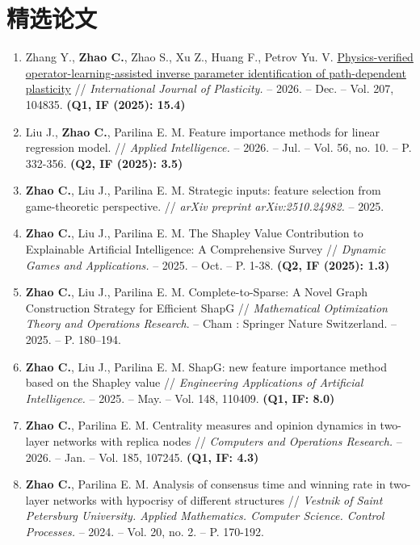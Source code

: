 \documentclass[letterpaper,10pt,fontset=none]{ctexart}
\begin{document}
\section{精选论文}
\begin{enumerate}[itemsep=2pt,parsep=0pt]
  \fontsize{10}{10.5}\selectfont
  \item Zhang Y., \textbf{Zhao C.}, Zhao S., Xu Z., Huang F., Petrov Yu. V.
        \href{https://doi.org/10.1016/j.ijplas.2026.104835}{Physics-verified
        operator-learning-assisted inverse parameter identification of
        path-dependent plasticity} // {\it International Journal of
        Plasticity.} -- 2026. -- Dec. -- Vol. 207, 104835. {\bf (Q1, IF (2025):
        15.4)}
  \item Liu J., \textbf{Zhao C.}, Parilina E. M. Feature importance methods for
        linear regression model. // {\it Applied Intelligence.} -- 2026. --
        Jul. -- Vol. 56, no. 10. -- P. 332-356. {\bf (Q2, IF (2025): 3.5)}
  \item \textbf{Zhao C.}, Liu J., Parilina E. M. Strategic inputs: feature selection from game-theoretic perspective. // {\it arXiv preprint arXiv:2510.24982.} -- 2025.
  \item \textbf{Zhao C.}, Liu J., Parilina E. M. The Shapley Value Contribution to Explainable Artificial Intelligence: A Comprehensive Survey // {\it Dynamic Games and Applications.} -- 2025. -- Oct. -- P. 1-38. {\bf (Q2, IF (2025): 1.3)}
  \item \textbf{Zhao C.}, Liu J., Parilina E. M. Complete-to-Sparse: A Novel Graph Construction Strategy for Efficient ShapG // {\it Mathematical Optimization Theory and Operations Research}. -- Cham : Springer Nature Switzerland. -- 2025. -- P. 180–194.
  \item \textbf{Zhao C.}, Liu J., Parilina E. M. ShapG: new feature importance method based on the Shapley value // {\it Engineering Applications of Artificial Intelligence.} -- 2025. -- May. -- Vol. 148, 110409. {\bf (Q1, IF: 8.0)}
        \newpage
  \item \textbf{Zhao C.}, Parilina E. M. Centrality measures and opinion dynamics in two-layer networks with replica nodes // {\it Computers and Operations Research.} -- 2026. -- Jan. -- Vol. 185, 107245. {\bf (Q1, IF: 4.3)}
  \item \textbf{Zhao C.}, Parilina E. M. Analysis of consensus time and winning rate in two-layer networks with hypocrisy of different structures // {\it Vestnik of Saint Petersburg University. Applied Mathematics. Computer Science. Control Processes.} -- 2024. -- Vol. 20, no. 2. -- P. 170-192.

\end{enumerate}
\end{document}
